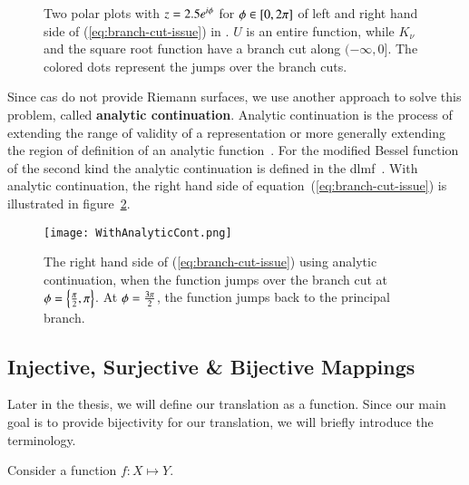 \begin{figure}[!ht]
    \centering
    \hspace{1cm}
    \caption{Two polar plots with $z=2.5{e}^{{i}\phi}$ for $\phi \in [0,2{\pi}]$ of left and right hand side of (\ref{eq:branch-cut-issue}) in \Maple. $U$ is an entire function, while $K_\nu$ and the square root function have a branch cut along $(-\infty,0]$. The colored dots represent the jumps over the branch cuts.}
    \label{fig:u-bessel}
\end{figure}

Since \gls{cas} do not provide Riemann surfaces, we use another approach to solve this problem, called \textbf{analytic continuation}. Analytic continuation is the process of extending the range of validity of a representation or more generally extending the region of definition of an analytic function~\parencite[152]{ComplexVariables}. For the modified Bessel function of the second kind the analytic continuation is defined in the \gls{dlmf}~\parencite[(10.34.4)]{NIST:DLMF}. With analytic continuation, the right hand side of equation~(\ref{eq:branch-cut-issue}) is illustrated in figure~\ref{fig:analytic-cont}.

\begin{figure}[!ht]
    \centering
    \texttt{[image: WithAnalyticCont.png]}
    \caption{The right hand side of (\ref{eq:branch-cut-issue}) using analytic continuation, when the function jumps over the branch cut at $\phi = \left\{\frac{{\pi}}{2},{\pi}\right\}$. At $\phi = \frac{3{\pi}}{2}$, the function jumps back to the principal branch.}
    \label{fig:analytic-cont}
\end{figure}

\subsection{Injective, Surjective \& Bijective Mappings}
Later in the thesis, we will define our translation as a function. Since our main goal is to provide bijectivity for our translation, we will briefly introduce the terminology.

Consider a function $f: X \mapsto Y$.

